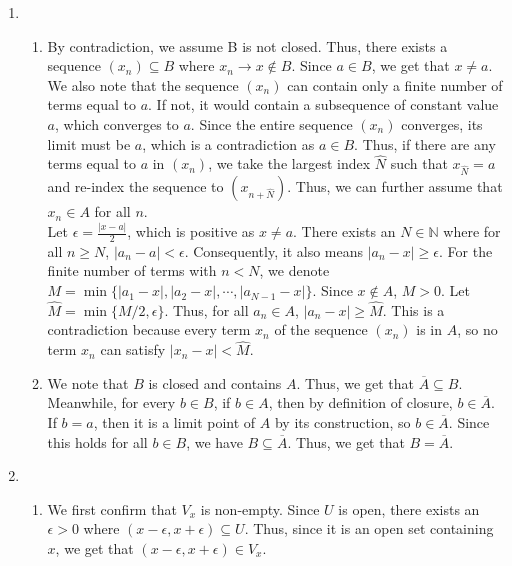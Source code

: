 \documentclass{article}
\begin{document}
\begin{enumerate}

\item
\begin{enumerate}
    \item
    By contradiction, we assume B is not closed. Thus, there exists a sequence $(x_n) \subseteq B$ where $x_n \xrightarrow{} x \notin B$. Since $a \in B$, we get that $x \not = a$. We also note that the sequence $(x_n)$ can contain only a finite number of terms equal to $a$. If not, it would contain a subsequence of constant value $a$, which converges to $a$. Since the entire sequence $(x_n)$ converges, its limit must be $a$, which is a contradiction as $a \in B$. Thus, if there are any terms equal to $a$ in $(x_n)$, we take the largest index $\hat{N}$ such that $x_{\hat{N}} = a$ and re-index the sequence to $(x_{n+\hat{N}})$. Thus, we can further assume that $x_n \in A$ for all $n$.\\

    Let $\epsilon = \frac{|x-a|}{2}$, which is positive as $x \not= a$. There exists an $N \in \mathbb{N}$ where for all $n \geq N$, $|a_n - a| < \epsilon$. Consequently, it also means $|a_n - x| \geq \epsilon$. For the finite number of terms with $n < N$, we denote $M = \min\{|a_1 - x|, |a_2 - x|, \cdots, |a_{N-1} - x|\}$. Since $x \notin A$, $M > 0$. Let $\hat{M} = \min\{M/2, \epsilon\}$. Thus, for all $a_n \in A$, $|a_n - x| \geq \hat{M}$. This is a contradiction because every term $x_n$ of the sequence $(x_n)$ is in $A$, so no term $x_n$ can satisfy $|x_n -x | < \hat{M}$. \\

    \item
    We note that $B$ is closed and contains $A$. Thus, we get that $\overline{A} \subseteq B$. Meanwhile, for every $b \in B$, if $b \in A$, then by definition of closure, $b \in \overline{A}$. If $b = a$, then it is a limit point of $A$ by its construction, so $b \in \overline{A}$. Since this holds for all $b \in B$, we have $B \subseteq \overline{A}$. Thus, we get that $B = \overline{A}$. 
\end{enumerate}
\newpage

\item
\begin{enumerate}
\item
 We first confirm that $V_x$ is non-empty. Since $U$ is open, there exists an $\epsilon > 0$ where $(x - \epsilon, x + \epsilon) \subseteq U$. Thus, since it is an open set containing $x$, we get that $(x - \epsilon, x + \epsilon) \in V_x$. \\


\end{enumerate}
\end{enumerate}
\end{document}
